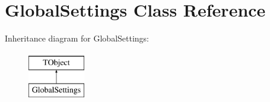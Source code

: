 \hypertarget{class_global_settings}{\section{Global\-Settings Class Reference}
\label{class_global_settings}
}
Inheritance diagram for Global\-Settings\-:\begin{figure}[H]
\begin{center}
\leavevmode
\includegraphics[height=2.000000cm]{class_global_settings}
\end{center}
\end{figure}
